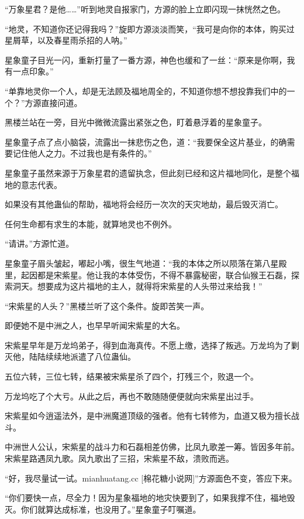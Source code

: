 
\begin{this_body}

“万象星君？是他……”听到地灵自报家门，方源的脸上立即闪现一抹恍然之色。

“地灵，不知道你还记得我吗？”旋即方源淡淡而笑，“我可是向你的本体，购买过星屑草，以及春星雨杀招的人呐。”

星象童子目光一闪，重新打量了一番方源，神色也缓和了一丝：“原来是你啊，我有一点印象。”

“单靠地灵你一个人，却是无法顾及福地周全的，不知道你想不想投靠我们中的一个？”方源直接问道。

黑楼兰站在一旁，目光中微微流露出紧张之色，盯着悬浮着的星象童子。

星象童子点了点小脑袋，流露出一抹悲伤之色，道：“我要保全这片基业，的确需要记住他人之力。不过我也是有条件的。”

星象童子虽然来源于万象星君的遗留执念，但此刻已经和这片福地同化，是整个福地的意志代表。

如果没有其他蛊仙的帮助，福地将会经历一次次的天灾地劫，最后毁灭消亡。

任何生命都有求生的本能，就算地灵也不例外。

“请讲。”方源忙道。

星象童子眉头皱起，嘟起小嘴，很生气地道：“我的本体之所以陨落在第八星殿里，起因都是宋紫星。他让我的本体受伤，不得不暴露秘密，联合仙猴王石磊，探索洞天。想要成为这片福地的主人，就得将宋紫星的人头带过来给我！”

“宋紫星的人头？”黑楼兰听了这个条件。旋即苦笑一声。

即便她不是中洲之人，也早早听闻宋紫星的大名。

宋紫星早年是万龙坞弟子，得到血海真传。不愿上缴，选择了叛逃。万龙坞为了剿灭他，陆陆续续地派遣了八位蛊仙。

五位六转，三位七转，结果被宋紫星杀了四个，打残三个，败退一个。

万龙坞吃了个大亏。从此之后，再也不敢随随便便就向宋紫星出过手。

宋紫星如今逍遥法外，是中洲魔道顶级的强者。他有七转修为，血道又极为擅长战斗。

中洲世人公认，宋紫星的战斗力和石磊相差仿佛，比凤九歌差一筹。皆因多年前。宋紫星路遇凤九歌。凤九歌出了三招，宋紫星不敌，溃败而逃。

“好，我尽量试一试。mianhuatang.cc [棉花糖小说网]”方源面色不变，答应下来。

“你们要快一点，尽全力！因为星象福地的地灾快要到了，如果我撑不住，福地毁灭。你们就算达成标准，也没用了。”星象童子叮嘱道。


\end{this_body}
